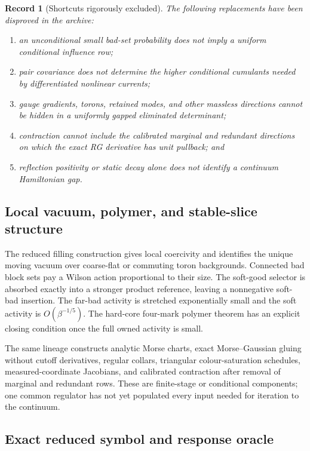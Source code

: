 \documentclass[11pt,oneside]{article}
\newtheorem{record}[theorem]{Record}
\theoremstyle{definition}
\theoremstyle{remark}
\begin{document}
\begin{record}[Shortcuts rigorously excluded]
\label{rec:newv1-permanent-nogos}
The following replacements have been disproved in the archive:
\begin{enumerate}[label=\textup{(\roman*)},leftmargin=3.3em]
\item an unconditional small bad-set probability does not imply a
uniform conditional influence row;
\item pair covariance does not determine the higher conditional
cumulants needed by differentiated nonlinear currents;
\item gauge gradients, torons, retained modes, and other massless
directions cannot be hidden in a uniformly gapped eliminated
determinant;
\item contraction cannot include the calibrated marginal and
redundant directions on which the exact RG derivative has unit
pullback; and
\item reflection positivity or static decay alone does not identify
a continuum Hamiltonian gap.
\end{enumerate}
\end{record}

\subsection{Local vacuum, polymer, and stable-slice structure}

The reduced filling construction gives local coercivity and
identifies the unique moving vacuum over coarse-flat or commuting
toron backgrounds.  Connected bad block sets pay a Wilson action
proportional to their size.  The soft-good selector is absorbed
exactly into a stronger product reference, leaving a nonnegative
soft-bad insertion.  The far-bad activity is stretched
exponentially small and the soft activity is \(O(\beta^{-1/5})\).
The hard-core four-mark polymer theorem has an explicit closing
condition once the full owned activity is small.

The same lineage constructs analytic Morse charts, exact
Morse--Gaussian gluing without cutoff derivatives, regular collars,
triangular colour-saturation schedules, measured-coordinate
Jacobians, and calibrated contraction after removal of marginal and
redundant rows.  These are finite-stage or conditional components;
one common regulator has not yet populated every input needed for
iteration to the continuum.

\subsection{Exact reduced symbol and response oracle}
\end{document}
